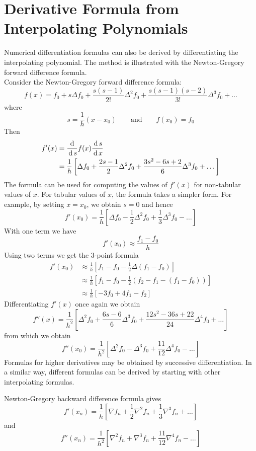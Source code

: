 \documentclass[12pt,class=book,crop=false]{standalone}
\begin{document}
\section{Derivative Formula from Interpolating Polynomials}
Numerical differentiation formulas can also be derived by differentiating the interpolating polynomial. The method is illustrated with the Newton-Gregory forward difference formula.\\
Consider the Newton-Gregory forward difference formula:
\[
    f(x)=f_0+s\Delta f_0+\frac{s(s-1)}{2!} \Delta^2 f_0+\frac{s(s-1)(s-2)}{3!}\Delta^3 f_0+\dots
\]
where
\[
    s=\frac{1}{h}(x-x_0) \qquad\text{and}\qquad f(x_0)=f_0
\]
Then
\begin{align*}
    f'(x) & =\frac{\,\mathrm{d}\,}{\,\mathrm{d}\, s}f(x)\frac{\,\mathrm{d}\, s}{\,\mathrm{d}\, x}                                                                    \\
          & =\frac{1}{h}\left[ \Delta f_0+\frac{2s-1}{2} \Delta^2 f_0+\frac{3s^2-6s+2}{6} \Delta^3 f_0+\dots \right]
\end{align*}
The formula can be used for computing the values of $ f' (x) $ for non-tabular values of $ x $. For tabular values of $ x $, the formula takes a simpler form. For example, by setting $ x=x_0 $, we obtain $ s=0 $ and hence
\[
    f' (x_0)=\frac{1}{h}\left[ \Delta f_0-\frac{1}{2} \Delta^2 f_0+\frac{1}{3} \Delta^3 f_0-\dots \right]
\]
With one term we have
\[
    f'(x_0)\approx\frac{f_1-f_0}{h}
\]
Using two terms we get the 3-point formula
\begin{align*}
    f'(x_0) & \approx \frac{1}{h} \left[ f_1-f_0-\frac{1}{2} \Delta(f_1-f_0 ) \right]    \\
            & \approx \frac{1}{h} \left[ f_1-f_0-\frac{1}{2} (f_2-f_1-(f_1-f_0)) \right] \\
            & \approx \frac{1}{h} [-3f_0+4f_1-f_2 ]
\end{align*}
Differentiating $ f' (x) $ once again we obtain
\[
    f''(x)=\frac{1}{h^2}\left[ \Delta^2 f_0+\frac{6s-6}{6} \Delta^3 f_0+\frac{12s^2-36s+22}{24} \Delta^4 f_0+\dots \right]
\]
from which we obtain
\[
    f''(x_0)=\frac{1}{h^2}\left[ \Delta^2 f_0-\Delta^3 f_0+\frac{11}{12} \Delta^4 f_0-\dots\right]
\]
Formulas for higher derivatives may be obtained by successive differentiation. In a similar way, different formulas can be derived by starting with other interpolating formulas.


Newton-Gregory backward difference formula gives
\[
    f'(x_n)=\frac{1}{h}\left[ \nabla f_n+\frac{1}{2} \nabla^2 f_n+\frac{1}{3} \nabla^3 f_n+\dots \right]
\]
and
\[
    f''(x_n)=\frac{1}{h^2}\left[  \nabla^2 f_n+\nabla^3 f_n+\frac{11}{12} \nabla^4 f_n-\dots\right]
\]
\end{document}
